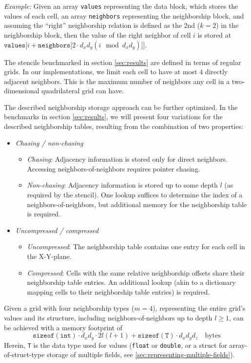 \textit{Example:} Given an array \texttt{values} representing the data block, which stores the values of each cell, an array \texttt{neighbors} representing the neighborship block, and assuming the ``right'' neighborship relation is defined as the 2nd ($k=2$) in the neighborship block, then the value of the right neighbor of cell $i$ is stored at $\mathtt{values[}i + \mathtt{neighbors[}2\cdot d_xd_y(i \mod d_xd_y)\mathtt{]]}$.

The stencils benchmarked in section \ref{sec:results} are defined in terms of regular grids. In our implementations, we limit each cell to have at most $4$ directly adjacent neighbors. This is the maximum number of neighbors any cell in a two-dimensional quadrilateral grid can have.

The described neighborship storage approach can be further optimized. In the  benchmarks in section \ref{sec:results}, we will present four variations for the described neighborship tables, resulting from the combination of two properties:

\begin{itemize}
    \item \emph{Chasing / non-chasing}
    \begin{itemize}
        \item \emph{Chasing}: Adjacency information is stored only for direct neighbors. Accessing neighbors-of-neighbors requires pointer chasing.
        \item \emph{Non-chasing}: Adjacency information is stored up to some depth $l$ (as required by the stencil). One lookup suffices to determine the index of a neighbors-of-neighbors, but additional memory for the neighborship table is required.
    \end{itemize}
    \item \emph{Uncompressed / compressed}
    \begin{itemize}
        \item \emph{Uncompressed}: The neighborship table contains one entry for each cell in the X-Y-plane.
        \item \emph{Compressed}: Cells with the same relative neighborship offsets share their neighborship table entries. An additional lookup (akin to a dictionary mapping cells to their neighborship table entries) is required.
    \end{itemize}
\end{itemize}

Given a grid with four neighborship types ($m=4$), representing the entire grid's values and its structure, including neighbors-of-neighbors up to depth $l \geq 1$, can be achieved with a memory footprint of 
$$\mathtt{sizeof(int)} \cdot d_xd_y \cdot 2 l(l+1) + \mathtt{sizeof(T)}\cdot d_xd_yd_z \quad \text{bytes}$$
Herein, \texttt{T} is the data type used for values (\texttt{float} or \texttt{double}, or a struct for array-of-struct-type storage of multiple fields, see \ref{sec:representing-multiple-fields}).


